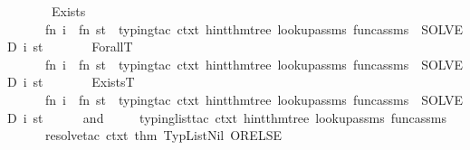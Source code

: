 \begin{isabellebody}
\isanewline
\ \ \ \ \ \ {\isacharparenleft}{\kern0pt}{\isacharasterisk}{\kern0pt}\ Exists\ {\isacharasterisk}{\kern0pt}{\isacharparenright}{\kern0pt}\isanewline
\ \ \ \ \ \ fn\ i\ {\isacharequal}{\kern0pt}{\isachargreater}{\kern0pt}\ fn\ st\ {\isacharequal}{\kern0pt}{\isachargreater}{\kern0pt}\ {\isacharparenleft}{\kern0pt}{\isacharparenleft}{\kern0pt}typing{\isacharunderscore}{\kern0pt}tac\ ctxt\ hint{\isacharunderscore}{\kern0pt}thm{\isacharunderscore}{\kern0pt}tree\ lookup{\isacharunderscore}{\kern0pt}assms\ func{\isacharunderscore}{\kern0pt}assms{\isacharparenright}{\kern0pt}\ {\isacharbar}{\kern0pt}{\isachargreater}{\kern0pt}\ SOLVED{\isacharprime}{\kern0pt}{\isacharparenright}{\kern0pt}\ i\ st{\isacharcomma}{\kern0pt}\isanewline
\isanewline
\ \ \ \ \ \ {\isacharparenleft}{\kern0pt}{\isacharasterisk}{\kern0pt}\ ForallT\ {\isacharasterisk}{\kern0pt}{\isacharparenright}{\kern0pt}\isanewline
\ \ \ \ \ \ fn\ i\ {\isacharequal}{\kern0pt}{\isachargreater}{\kern0pt}\ fn\ st\ {\isacharequal}{\kern0pt}{\isachargreater}{\kern0pt}\ {\isacharparenleft}{\kern0pt}{\isacharparenleft}{\kern0pt}typing{\isacharunderscore}{\kern0pt}tac\ ctxt\ hint{\isacharunderscore}{\kern0pt}thm{\isacharunderscore}{\kern0pt}tree\ lookup{\isacharunderscore}{\kern0pt}assms\ func{\isacharunderscore}{\kern0pt}assms{\isacharparenright}{\kern0pt}\ {\isacharbar}{\kern0pt}{\isachargreater}{\kern0pt}\ SOLVED{\isacharprime}{\kern0pt}{\isacharparenright}{\kern0pt}\ i\ st{\isacharcomma}{\kern0pt}\isanewline
\isanewline
\ \ \ \ \ \ {\isacharparenleft}{\kern0pt}{\isacharasterisk}{\kern0pt}\ ExistsT\ {\isacharasterisk}{\kern0pt}{\isacharparenright}{\kern0pt}\isanewline
\ \ \ \ \ \ fn\ i\ {\isacharequal}{\kern0pt}{\isachargreater}{\kern0pt}\ fn\ st\ {\isacharequal}{\kern0pt}{\isachargreater}{\kern0pt}\ {\isacharparenleft}{\kern0pt}{\isacharparenleft}{\kern0pt}typing{\isacharunderscore}{\kern0pt}tac\ ctxt\ hint{\isacharunderscore}{\kern0pt}thm{\isacharunderscore}{\kern0pt}tree\ lookup{\isacharunderscore}{\kern0pt}assms\ func{\isacharunderscore}{\kern0pt}assms{\isacharparenright}{\kern0pt}\ {\isacharbar}{\kern0pt}{\isachargreater}{\kern0pt}\ SOLVED{\isacharprime}{\kern0pt}{\isacharparenright}{\kern0pt}\ i\ st\isanewline
\ \ \ \ {\isacharbrackright}{\kern0pt}\isanewline
\ and\ \ \isanewline
\ \ \ typing{\isacharunderscore}{\kern0pt}list{\isacharunderscore}{\kern0pt}tac\ ctxt\ hint{\isacharunderscore}{\kern0pt}thm{\isacharunderscore}{\kern0pt}tree\ lookup{\isacharunderscore}{\kern0pt}assms\ func{\isacharunderscore}{\kern0pt}assms\ {\isacharequal}{\kern0pt}\ \isanewline
\ \ \ \ \ \ resolve{\isacharunderscore}{\kern0pt}tac\ ctxt\ {\isacharbrackleft}{\kern0pt}{\isacharat}{\kern0pt}{\isacharbraceleft}{\kern0pt}thm\ TypListNil{\isacharbraceright}{\kern0pt}{\isacharbrackright}{\kern0pt}\ ORELSE{\isacharprime}{\kern0pt}\isanewline

\end{isabellebody}
